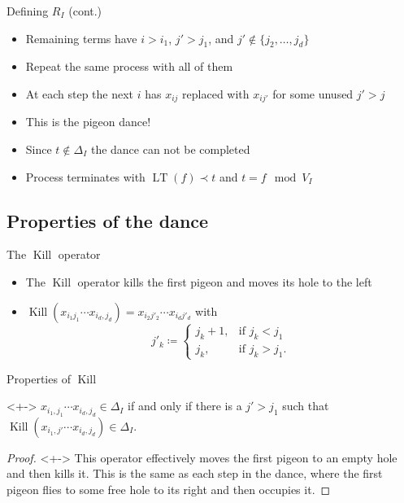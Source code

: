 \documentclass[xcolor={dvipsnames}, aspectratio=169, handout]{beamer}
\newcommand{\LT}{\operatorname{LT}}
\renewcommand{\K}{\operatorname{Kill}}
\begin{document}
\begin{frame}{Defining $R_I$ (cont.)}
    \begin{itemize}[<+->]
        \item Remaining terms have $i > i_1$, $j' > j_1$, and $j' \not\in \{j_2, \ldots, j_d\}$
        \item Repeat the same process with all of them
        \item At each step the next $i$ has $x_{i j}$ replaced with $x_{i j'}$ for some unused $j' > j$
        \item This is the pigeon dance!
        \item Since $t \not\in \Delta_I$ the dance can not be completed
        \item Process terminates with $\LT(f) \prec t$ and $t = f \mod V_I$
    \end{itemize}
\end{frame}

\subsection{Properties of the dance}
\begin{frame}{The $\K$ operator}
    \begin{itemize}[<+->]
        \item The $\K$ operator kills the first pigeon and moves its hole to the left
        \item $\K(x_{i_1 j_1} \cdots x_{i_d, j_d}) = x_{i_2 j'_2} \cdots x_{i_d j'_d}$ with\\
            $$j'_k \coloneqq \begin{cases}
                    j_k + 1, &\text{if } j_k < j_1\\
                    j_k, &\text{if } j_k > j_1.
                \end{cases}$$
    \end{itemize}
\end{frame}

\begin{frame}{Properties of $\K$}
    \begin{theorem}<+->
        $x_{i_1, j_1} \cdots x_{i_d, j_d} \in \Delta_I$ if and only if there is a $j' > j_1$ such that $\K(x_{i_1, j'} \cdots x_{i_d, j_d}) \in \Delta_I$.
    \end{theorem}
    \begin{proof}[Proof\nopunct]<+->
        This operator effectively moves the first pigeon to an empty hole and then kills it. This is the same as each step in the dance, where the first pigeon flies to some free hole to its right and then occupies it.
    \end{proof}
\end{frame}
\end{document}
